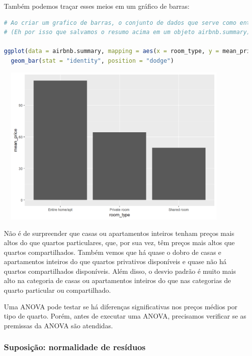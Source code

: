 \documentclass{article}
\begin{document}
Também podemos traçar esses meios em um gráfico de barras:

\begin{lstlisting}[language=R]
# Ao criar um grafico de barras, o conjunto de dados que serve como entrada para o ggplot eh o resumo com os meios, nao o conjunto de dados completo.
# (Eh por isso que salvamos o resumo acima em um objeto airbnb.summary)

ggplot(data = airbnb.summary, mapping = aes(x = room_type, y = mean_price)) + 
  geom_bar(stat = "identity", position = "dodge")
\end{lstlisting}

\begin{center}
\includegraphics[width=12cm,height=8cm]{modelling_oneway_barplot-1.png} 
\end{center}

Não é de surpreender que casas ou apartamentos inteiros tenham preços mais altos do que quartos particulares, que, por sua vez, têm preços mais altos que quartos compartilhados. Também vemos que há quase o dobro de casas e apartamentos inteiros do que quartos privativos disponíveis e quase não há quartos compartilhados disponíveis. Além disso, o desvio padrão é muito mais alto na categoria de casas ou apartamentos inteiros do que nas categorias de quarto particular ou compartilhado.

Uma ANOVA pode testar se há diferenças significativas nos preços médios por tipo de quarto. Porém, antes de executar uma ANOVA, precisamos verificar se as premissas da ANOVA são atendidas.

\newpage

\subsubsection{Suposição: normalidade de resíduos}
\end{document}

